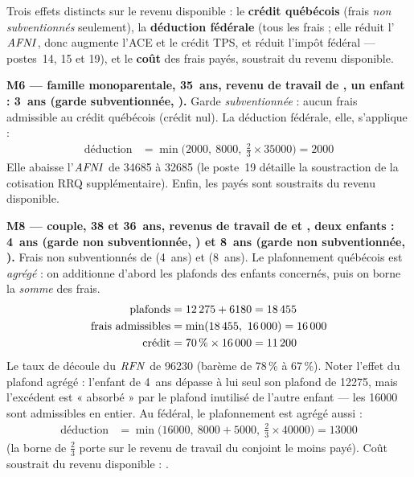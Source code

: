 \pexemples Trois effets distincts sur le revenu disponible : le \textbf{crédit
québécois} (frais \emph{non subventionnés} seulement), la \textbf{déduction
fédérale} (tous les frais ; elle réduit l'$\mathit{AFNI}$, donc augmente l'ACE et le
crédit TPS, et réduit l'impôt fédéral — postes~14, 15 et 19), et le
\textbf{coût} des frais payés, soustrait du revenu disponible.

\medskip\noindent\textbf{M6 --- famille monoparentale, 35~ans, revenu de travail de , un enfant : 3~ans (garde subventionnée, ).}
Garde \emph{subventionnée} : aucun frais admissible au crédit
québécois (crédit nul). La déduction fédérale, elle, s'applique :
\begin{align*}
\text{déduction} &= \min\bigl(\num{2000},\ \num{8000},\ \tfrac{2}{3} \times \num{35000}\bigr) = \num{2000}
\end{align*}
Elle abaisse l'$\mathit{AFNI}$ de \num{34685} à \num{32685} (le poste~19
détaille la soustraction de la cotisation RRQ supplémentaire). Enfin, les
 payés sont soustraits du revenu disponible.

\medskip\noindent\textbf{M8 --- couple, 38 et 36~ans, revenus de travail de  et , deux enfants : 4~ans (garde non subventionnée, ) et 8~ans (garde non subventionnée, ).}
Frais non subventionnés de  (4~ans) et 
(8~ans). Le plafonnement québécois est \emph{agrégé} : on additionne d'abord
les plafonds des enfants concernés, puis on borne la \emph{somme} des frais.
\begin{align*}
\text{plafonds} &= \num{12275} + \num{6180} = \num{18455} \\
\text{frais admissibles} &= \min(\num{18455},\ \num{16000}) = \num{16000} \\
\text{crédit} &= \num{70}\,\% \times \num{16000} = \num{11200}
\end{align*}
Le taux de  découle du $\mathit{RFN}$ de \num{96230}
(barème de 78\,\% à 67\,\%). Noter l'effet du plafond agrégé : l'enfant de
4~ans dépasse à lui seul son plafond de \num{12275}, mais l'excédent
est « absorbé » par le plafond inutilisé de l'autre enfant — les \num{16000}
sont admissibles en entier. Au fédéral, le plafonnement est agrégé aussi :
\begin{align*}
\text{déduction} &= \min\bigl(\num{16000},\ \num{8000} + \num{5000},\ \tfrac{2}{3} \times \num{40000}\bigr) = \num{13000}
\end{align*}
(la borne de $\tfrac{2}{3}$ porte sur le revenu de travail du conjoint le
moins payé). Coût soustrait du revenu disponible : .

